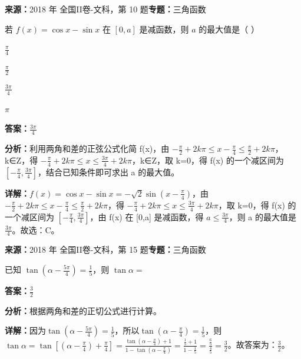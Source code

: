\begin{question}[points=5]
\textbf{来源：}2018 年 全国II卷-文科，第 10 题\quad \textbf{专题：}三角函数\par
若 $f(x)=\cos x-\sin x$ 在 $[0,a]$ 是减函数，则 $a$ 的最大值是（ ）
\begin{choices}
  \item $\frac{\pi}{4}$
  \item $\frac{\pi}{2}$
  \item $\frac{3\pi}{4}$
  \item $\pi$
\end{choices}
\begin{solution}
\textbf{答案：}$\frac{3\pi}{4}$

\textbf{分析：}利用两角和差的正弦公式化简 f(x)，由 $-\frac{\pi}{2}+2k\pi\leq x-\frac{\pi}{4}\leq \frac{\pi}{2}+2k\pi$，k∈Z，得 $-\frac{\pi}{4}+2k\pi\leq x\leq \frac{3\pi}{4}+2k\pi$，k∈Z，取 k=0，得 f(x) 的一个减区间为 $[-\frac{\pi}{4},\frac{3\pi}{4}]$，结合已知条件即可求出 a 的最大值。

\textbf{详解：}$f(x)=\cos x-\sin x=-\sqrt{2}\sin(x-\frac{\pi}{4})$，由 $-\frac{\pi}{2}+2k\pi\leq x-\frac{\pi}{4}\leq \frac{\pi}{2}+2k\pi$，得 $-\frac{\pi}{4}+2k\pi\leq x\leq \frac{3\pi}{4}+2k\pi$，取 k=0，得 f(x) 的一个减区间为 $[-\frac{\pi}{4},\frac{3\pi}{4}]$，由 f(x) 在 [0,a] 是减函数，得 $a\leq \frac{3\pi}{4}$，则 a 的最大值是 $\frac{3\pi}{4}$。故选：C。
\end{solution}
\end{question}

\begin{question}[points=5]
\textbf{来源：}2018 年 全国II卷-文科，第 15 题\quad \textbf{专题：}三角函数\par
已知 $\tan(\alpha-\frac{5\pi}{4})=\frac{1}{5}$，则 $\tan\alpha=$
\fillin[{$\frac{3}{2}$}]
\begin{solution}
\textbf{答案：}$\frac{3}{2}$

\textbf{分析：}根据两角和差的正切公式进行计算。

\textbf{详解：}因为$\tan(\alpha-\frac{5\pi}{4})=\frac{1}{5}$，所以$\tan(\alpha-\frac{\pi}{4})=\frac{1}{5}$，则 $\tan\alpha=\tan[(\alpha-\frac{\pi}{4})+\frac{\pi}{4}]=\frac{\tan(\alpha-\frac{\pi}{4})+1}{1-\tan(\alpha-\frac{\pi}{4})}=\frac{\frac{1}{5}+1}{1-\frac{1}{5}}=\frac{\frac{6}{5}}{\frac{4}{5}}=\frac{3}{2}$。故答案为：$\frac{3}{2}$。
\end{solution}
\end{question}

